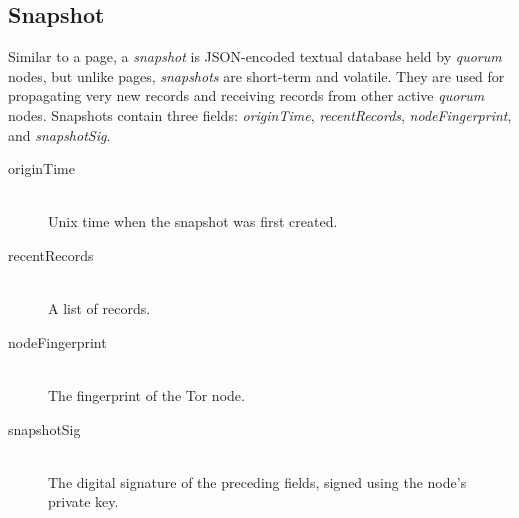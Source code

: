 

%
%			
%			
%			
%			
%			
%			

\subsection{Snapshot}

Similar to a page, a \emph{snapshot} is JSON-encoded textual database held by \emph{quorum} nodes, but unlike pages, \emph{snapshots} are short-term and volatile. They are used for propagating very new records and receiving records from other active \emph{quorum} nodes. Snapshots contain three fields: \emph{originTime}, \emph{recentRecords}, \emph{nodeFingerprint}, and \emph{snapshotSig}.

\begin{description}
	\item[originTime] \hfill \\
		Unix time when the snapshot was first created.
	\item[recentRecords] \hfill \\
		A list of records.
	\item[nodeFingerprint] \hfill \\
		The fingerprint of the Tor node.
	\item[snapshotSig] \hfill \\
		The digital signature of the preceding fields, signed using the node's private key.
\end{description}

